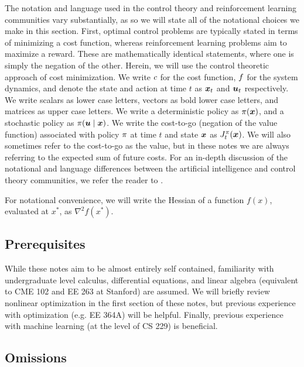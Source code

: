 The notation and language used in the control theory and reinforcement learning communities vary substantially, as so we will state all of the notational choices we make in this section. First, optimal control problems are typically stated in terms of minimizing a cost function, whereas reinforcement learning problems aim to maximize a reward. These are mathematically identical statements, where one is simply the negation of the other. Herein, we will use the control theoretic approach of cost minimization. We write $c$ for the cost function, $f$ for the system dynamics, and denote the state and action at time $t$ as $\bm{x}_t$ and $\bm{u}_t$ respectively. We write scalars as lower case letters, vectors as bold lower case letters, and matrices as upper case letters. We write a deterministic policy as $\pi(\bm{x})$, and a stochastic policy as $\pi(\bm{u}\mid\bm{x})$.
We write the cost-to-go (negation of the value function) associated with policy $\pi$ at time $t$ and state $\bm{x}$ as $J^\pi_t(\bm{x})$. We will also sometimes refer to the cost-to-go as the value, but in these notes we are always referring to the expected sum of future costs. 
For an in-depth discussion of the notational and language differences between the artificial intelligence and control theory communities, we refer the reader to \cite{powell2012ai}.

For notational convenience, we will write the Hessian of a function $f(x)$, evaluated at $x^*$, as $\nabla^2 f(x^*)$.

\subsection*{Prerequisites}

While these notes aim to be almost entirely self contained, familiarity with undergraduate level calculus, differential equations, and linear algebra (equivalent to CME 102 and EE 263 at Stanford) are assumed. We will briefly review nonlinear optimization in the first section of these notes, but previous experience with optimization (e.g. EE 364A) will be helpful. Finally, previous experience with machine learning (at the level of CS 229) is beneficial. 

\subsection*{Omissions}


